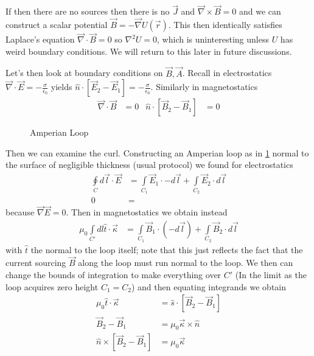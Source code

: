 \documentclass[10pt]{report}
\begin{document}
If then there are no sources then there is no $\vec{J}$ and $\vec{\nabla}\times \vec{B} = 0$ and we can construct a scalar potential $\vec{B} = -\vec{\nabla}U(\vec{r})$. This then identically satisfies Laplace's equation $\vec{\nabla}\cdot \vec{B} = 0$ so $\nabla^2 U = 0$, which is uninteresting unless $U$ has weird boundary conditions. We will return to this later in future discussions.

Let's then look at boundary conditions on $\vec{B}, \vec{A}$. Recall in electrostatics $\vec{\nabla} \cdot \vec{E} = -\frac{\sigma}{\epsilon_0}$ yields $\hat{n}\cdot \left[ \vec{E}_2 - \vec{E}_1 \right] = -\frac{\sigma}{\epsilon_0}$. Similarly in magnetostatics
\begin{align}
    \vec{\nabla}\cdot\vec{B} &= 0 & \hat{n} \cdot\left[ \vec{B}_2 - \vec{B}_1 \right] &= 0
\end{align}

\begin{figure}[!h]
    \centering
    \caption{Amperian Loop}
    \label{4.8.Loop}
\end{figure}
Then we can examine the curl. Constructing an Amperian loop as in \ref{4.8.Loop} normal to the surface of negligible thickness (usual protocol) we found for electrostatics
\begin{align}
    \oint\limits_C d\vec{l} \cdot \vec{E} &= \int\limits_{C_1}^{}\vec{E}_1 \cdot -d\vec{l} + \int\limits_{C_2}^{}\vec{E}_2 \cdot d\vec{l}\\
    0 &= 
\end{align}
because $\vec{\nabla}\vec{E} = 0$. Then in magnetostatics we obtain instead
\begin{align}
    \mu_0\int\limits_{C'}^{}dl \hat{t}\cdot \vec{\kappa} &= \int\limits_{C_1}^{}\vec{B}_1 \cdot (-d\vec{l}) + \int\limits_{C_2}^{}\vec{B}_2 \cdot d\vec{l}
\end{align}
with $\hat{t}$ the normal to the loop itself; note that this just reflects the fact that the current sourcing $\vec{B}$ along the loop must run normal to the loop. We then can change the bounds of integration to make everything over $C'$ (In the limit as the loop acquires zero height $C_1 = C_2$) and then equating integrands we obtain
\begin{align}
    \mu_0 \hat{t}\cdot \vec{\kappa} &= \hat{s}\cdot\left[ \vec{B}_2 - \vec{B}_1 \right]\\
    \vec{B}_2 - \vec{B}_1 &= \mu_0\vec{\kappa}\times \hat{n}\\
    \hat{n}\times\left[\vec{B}_2 - \vec{B}_1\right] &= \mu_0\vec{\kappa}
\end{align}
\end{document}
